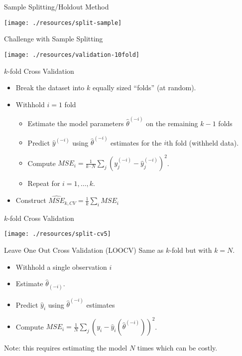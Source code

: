 \begin{frame}{Sample Splitting/Holdout Method}
  \begin{center}
  \texttt{[image: ./resources/split-sample]}
  \end{center}
\end{frame}
  
\begin{frame}{Challenge with Sample Splitting}
  \begin{center}
  \texttt{[image: ./resources/validation-10fold]}
  \end{center}
\end{frame}
  
\begin{frame}{$k$-fold Cross Validation}
  \begin{itemize}
  \item Break the dataset into $k$ equally sized ``folds'' (at random).
  \item Withhold $i=1$ fold
  \begin{itemize}
  \item Estimate the model parameters $\hat{\theta}^{(-i)}$ on the remaining $k-1$ folds
  \item Predict $\hat{y}^{(-i)}$ using $\hat{\theta}^{(-i)}$ estimates for the $i$th fold (withheld data).
  \item Compute $MSE_i =\frac{1}{k \cdot N} \sum_j (y^{(-i)}_j -\hat{y}^{(-i)}_j)^2$.
  \item Repeat for $i=1,\ldots,k$.
  \end{itemize}
  \item Construct $\widehat{MSE}_{k,CV} = \frac{1}{k} \sum_i MSE_{i}$
  \end{itemize}
\end{frame}
  
\begin{frame}{$k$-fold Cross Validation}
  \begin{center}
  \texttt{[image: ./resources/split-cv5]}
  \end{center}
\end{frame}

\begin{frame}{Leave One Out Cross Validation (LOOCV)}
  Same as $k$-fold but with $k=N$.
  \begin{itemize}
  \item Withhold a single observation $i$
  \item Estimate $\hat{\theta}_{(-i)}$.
  \item Predict $\hat{y}_i$ using $\hat{\theta}^{(-i)}$ estimates
  \item Compute $MSE_i =\frac{1}{N} \sum_j (y_i -\hat{y}_i(\hat{\theta}^{(-i)}))^2$.
  \end{itemize}
  \vspace{0.2cm}
  Note: this requires estimating the model $N$ times which can be costly.
\end{frame}
    
